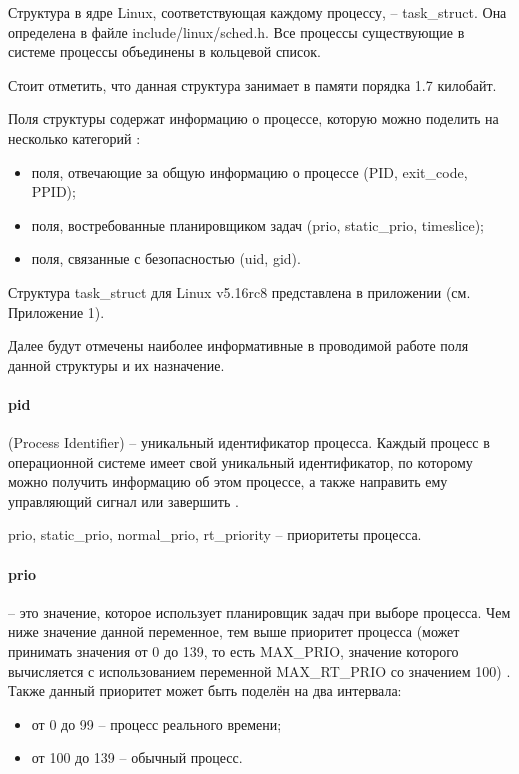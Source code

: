 Структура в ядре Linux, соответствующая каждому процессу, -- task\_struct. Она определена в файле include/linux/sched.h. Все процессы существующие в системе процессы объединены в кольцевой список. \cite{linuxTasks} 

Стоит отметить, что данная структура занимает в памяти порядка 1.7 килобайт.

Поля структуры содержат информацию о процессе, которую можно поделить на несколько категорий \cite{linuxTasks}:
\begin{itemize}[leftmargin=1.6\parindent]
\item поля, отвечающие за общую информацию о процессе (PID, exit\_code, PPID);
\item поля, востребованные планировщиком задач (prio, static\_prio, timeslice);
\item поля, связанные с безопасностью (uid, gid).
\end{itemize}

Структура task\_struct для Linux v5.16rc8 представлена в приложении (см. Приложение 1).

Далее будут отмечены наиболее информативные в проводимой работе поля данной структуры и их назначение.

\paragraph*{pid} (Process Identifier) -- уникальный идентификатор процесса. Каждый процесс в операционной системе имеет свой уникальный идентификатор, по которому можно получить информацию об этом процессе, а также направить ему управляющий сигнал или завершить \cite{losst}.

prio, static\_prio, normal\_prio, rt\_priority -- приоритеты процесса.

\paragraph*{prio} -- это значение, которое использует планировщик задач при выборе процесса. Чем ниже значение данной переменное, тем выше приоритет процесса (может принимать значения от 0 до 139, то есть MAX\_PRIO, значение которого вычисляется с использованием переменной MAX\_RT\_PRIO со значением 100) \cite{linuxPriority}. Также данный приоритет может быть поделён на два интервала:
\begin{itemize}[leftmargin=1.6\parindent]
\item от 0 до 99 -- процесс реального времени;
\item от 100 до 139 -- обычный процесс.
\end{itemize}

